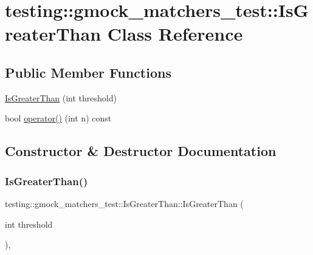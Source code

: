 \hypertarget{classtesting_1_1gmock__matchers__test_1_1_is_greater_than}{}\section{testing\+:\+:gmock\+\_\+matchers\+\_\+test\+:\+:Is\+Greater\+Than Class Reference}
\label{classtesting_1_1gmock__matchers__test_1_1_is_greater_than}
\subsection*{Public Member Functions}
\begin{DoxyCompactItemize}
\item 
\hyperlink{classtesting_1_1gmock__matchers__test_1_1_is_greater_than_a6682979fb1ed5511995e575954d07aaf}{Is\+Greater\+Than} (int threshold)
\item 
bool \hyperlink{classtesting_1_1gmock__matchers__test_1_1_is_greater_than_a34b455148a2d299c654bc4443db0af67}{operator()} (int n) const
\end{DoxyCompactItemize}


\subsection{Constructor \& Destructor Documentation}
\mbox{\label{classtesting_1_1gmock__matchers__test_1_1_is_greater_than_a6682979fb1ed5511995e575954d07aaf}} 
\subsubsection{\texorpdfstring{Is\+Greater\+Than()}{IsGreaterThan()}}
{\footnotesize\ttfamily testing\+::gmock\+\_\+matchers\+\_\+test\+::\+Is\+Greater\+Than\+::\+Is\+Greater\+Than (\begin{DoxyParamCaption}\item[{int}]{threshold }\end{DoxyParamCaption})\hspace{0.3cm}{\ttfamily [inline]}, {\ttfamily [explicit]}}




